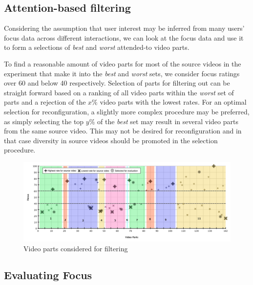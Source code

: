 
\subsection{Attention-based filtering} %
\label{sub:attention_based_filtering}

Considering the assumption that user interest may be inferred from many users' focus data across different interactions, we can look at the focus data and use it to form a selections of \emph{best} and \emph{worst} attended-to video parts.

To find a reasonable amount of video parts for most of the source videos in the experiment that make it into the \emph{best} and \emph{worst} sets, we consider focus ratings over 60 and below 40 respectively. Selection of parts for filtering out can be straight forward based on a ranking of all video parts within the \emph{worst} set of parts and a rejection of the $x\%$ video parts with the lowest rates. For an optimal selection for reconfiguration, a slightly more complex procedure may be preferred, as simply selecting the top $y\%$ of the \emph{best} set may result in several video parts from the same source video. This may not be desired for reconfiguration and in that case diversity in source videos should be promoted in the selection procedure.

\begin{figure}[htbp]
  \centering
    \includegraphics[width=1\textwidth]{img/focus_selection}
  \caption{Video parts considered for filtering}
  \label{fig:focus_selection}
\end{figure}



\subsection{Evaluating Focus} %
\label{sub:evaluating_focus}

